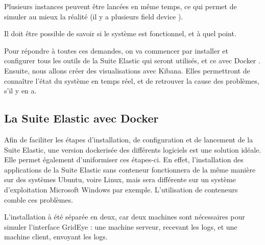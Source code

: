 \documentclass[paper=a4, fontsize=11pt]{scrartcl}
\begin{document}
Plusieurs instances peuvent être lancées en même temps, ce qui permet de simuler au mieux la réalité (il y a plusieurs \og field device \fg).

Il doit être possible de savoir si le système est fonctionnel, et à quel point.

Pour répondre à toutes ces demandes, on va commencer par installer et configurer tous les outils de la Suite Elastic qui seront utilisés, et ce avec Docker \cite{noauthor_empowering_nodate}.
Ensuite, nous allons créer des visualisations avec Kibana. Elles permettront de connaître l'état du système en temps réel, et de retrouver la cause des problèmes, s'il y en a.

\subsection{La Suite Elastic avec Docker}
Afin de faciliter les étapes d'installation, de configuration et de lancement de la Suite Elastic, une version \og dockerisée \fg des différents logiciels est une solution idéale. Elle permet également d'uniformiser ces étapes-ci. En effet, l'installation des applications de la Suite Elastic sans conteneur fonctionnera de la même manière sur des systèmes Ubuntu, voire Linux, mais sera différente sur un système d'exploitation Microsoft Windows par exemple. L'utilisation de conteneurs comble ces problèmes.

L'installation à été séparée en deux, car deux machines sont nécessaires pour simuler l'interface GridEye : une machine serveur, recevant les logs, et une machine client, envoyant les logs.
\end{document}
